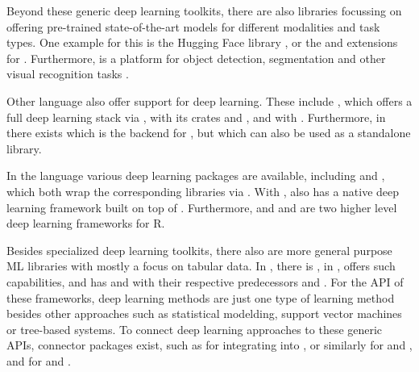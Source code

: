 \documentclass[article]{jss}
\theoremstyle{definition}
\begin{document}
Beyond these generic deep learning toolkits, there are also libraries focussing on offering pre-trained state-of-the-art models for different modalities and task types.
One example for this is the Hugging Face  library \citep{ref-wolf-etal-2020-transformers}, or the  \citep{ref-marcel2010torchvision} and  \citep{ref-yang2022torchaudio} extensions for \pytorch.
Furthermore,  is a platform for object detection, segmentation and other visual recognition tasks \citep{ref-wu2019detectron2}.

Other language also offer support for deep learning.
These include  \citep{ref-bezanson2017julia}, which offers a full deep learning stack via \flux{} \citep{ref-innes2018flux}, \rust{} \citep{ref-matsakis2014rust} with its crates  \citep{ref-burn} and  \citep{ref-candle}, and  \citep{ref-go} with  \citep{ref-gomlx}.
Furthermore, in \cpp{} there exists  which is the \cpp{} backend for \pytorch{}, but which can also be used as a standalone \cpp{} library.

In the  \citep{ref-R-base} language various deep learning packages are available, including  \citep{ref-keras32025} and  \citep{ref-r-tensorflow2024}, which both wrap the corresponding \pytorch{} libraries via  \citep{ref-reticulate2025}.
With  \citep{ref-torch2025},  also has a native deep learning framework built on top of .
Furthermore,  \citep{ref-luz2023} and and  \citep{ref-cito2024} are two higher level deep learning frameworks for R.

Besides specialized deep learning toolkits, there also are more general purpose ML libraries with mostly a focus on tabular data.
In \python, there is \sklearn{} \citep{ref-pedregosa2011scikit-learn}, in \julia{},  \mlj{} \citep{ref-blaom2020mlj} offers such capabilities, and \rlang{} has \tidymodels{} \citep{ref-kuhn2020tidymodels} and  \citep{ref-mlr32019} with their respective predecessors  \citep{ref-kuhn2021caret} and  \citep{ref-bischl2016mlr}.
For the API of these frameworks, deep learning methods are just one type of learning method besides other approaches such as statistical modelding, support vector machines or tree-based systems.
To connect deep learning approaches to these generic APIs, connector packages exist, such as  \citep{ref-skorch} for integrating  into \sklearn{}, or similarly  \citep{ref-MLJFlux} for \flux{} and \mlj, and  \citep{ref-brulee2025} for \torch{} and \tidymodels.
\end{document}

